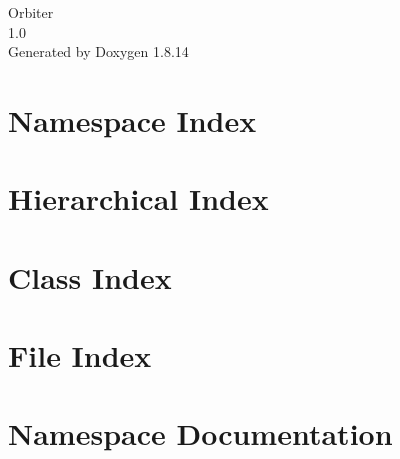\documentclass[twoside]{book}
\newcommand{\+}{\discretionary{\mbox{\scriptsize$\hookleftarrow$}}{}{}}
\newcommand{\clearemptydoublepage}{%
  \newpage{\pagestyle{empty}\cleardoublepage}%
}
\begin{document}
\hypersetup{pageanchor=false,
             bookmarksnumbered=true,
             pdfencoding=unicode
            }
\begin{titlepage}
\vspace*{7cm}
\begin{center}%
{\Large Orbiter \\[1ex]\large 1.\+0 }\\
\vspace*{1cm}
{\large Generated by Doxygen 1.8.14}\\
\end{center}
\end{titlepage}
\clearemptydoublepage
{}
\tableofcontents
\clearemptydoublepage
{}
\hypersetup{pageanchor=true}

\chapter{Namespace Index}

\chapter{Hierarchical Index}

\chapter{Class Index}

\chapter{File Index}

\chapter{Namespace Documentation}

\end{document}
